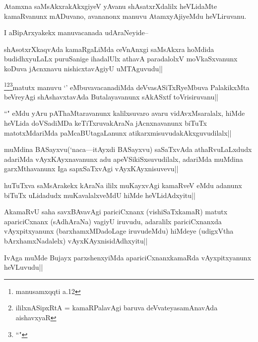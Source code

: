 \begin{artha}
Atamxna saMsAkxrakAkxgiyeV yAvanu shAsatxrXdalilx heVLidaMte kamaRvanunx mADuvano, avananonx manuvu AtamxyAjiyeMdu heVLiruvanu.
\end{artha}

\begin{artha}
I aBipArxyakekx manuvacanada udAraNeyide--
\end{artha}

\begin{artha}
shAsotxrXkaqvAda kamaRgaLiMda ceVnAnxgi saMsAkxra hoMdida budidhxyuLaLx puruSanige ihadalUlx athavA paradalolxV moVkaSxvanunx koDuva jAcnxnavu nishicxtavAgiyU uMTAguvudu||
\end{artha}

\begin{artha}
\footnote{\stext \stext manusamxqqti a.12}\footnote{\stext ililxnASipxRtA = kamaRPalavAgi baruva deVvateyasamAnavAda aishavxyaR}\footnote{``\stext"}matutx manuvu `\stext' eMbuvavacanadiMda deVvasASiTxRyeMbuva PalakikxMta beVreyAgi shAshavxtavAda Butalayavanunx sAkASxtf toVrisiruvanu||
\end{artha}

\begin{artha}
``\stext" eMdu yAru pAThaMtaravanunx kalilxsuvaro avaru vidAvxMsaralalx, hiMde heVLida doVSadiMDa keTiTxruvakAraNa jAcnxnavanunx biTuTx matotxMdariMda paMcaBUtagaLanunx atikarxmisuvudakAkxguvudilalx||
\end{artha}

\begin{artha}
muMdina BASayxvu(`naca---itAyxdi BASayxvu) saSaTxvAda athaRvuLaLxdudx adariMda vAyxKAyxnavanunx adu apeVSikiSxsuvudilalx, adariMda muMdina garxMthavanunx Iga sapxSaTxvAgi vAyxKAyxnisuvevu||	
\end{artha}

\begin{artha}
huTuTxva saMsArakekx kAraNa ililx muKayxvAgi kamaRveV eMdu adanunx biTuTx uLidadudx muKavalalxveMdU hiMde heVLidAdxyitu||
\end{artha}

\begin{artha}
AkamaRvU saha savxBAvavAgi pariciCxnanx (vishiSaTxkamaR) matutx apariciCxnanx (sAdhAraNa) vagiyU iruvudu, adaralilx pariciCxnanxda vAyxpitxyanunx (barxhamxMDadoLage iruvudeMdu) hiMdeye (udigxVtha bArxhamxNadalelx) vAyxKAyxnisidAdhxyitu||
\end{artha}

\begin{artha}
IvAga muMde Bujayx parxshenxyiMda apariciCxnanxkamaRda vAyxpitxyanunx heVLuvudu||
\end{artha}

